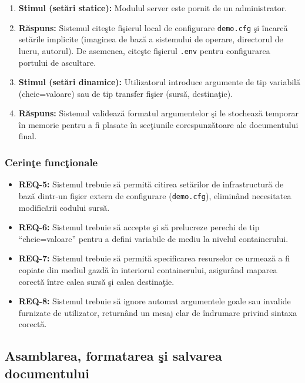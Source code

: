 \documentclass[12pt, a4paper]{article}
\begin{document}
\begin{enumerate}
    \item \textbf{Stimul (set\u{a}ri statice):} Modulul server este pornit de un administrator.
    \item \textbf{R\u{a}spuns:} Sistemul cite\c{s}te fi\c{s}ierul local de configurare \texttt{demo.cfg} \c{s}i \^{i}ncarc\u{a} set\u{a}rile
    implicite (imaginea de baz\u{a} a sistemului de operare, directorul de lucru, autorul). De asemenea,
    cite\c{s}te fi\c{s}ierul \texttt{.env} pentru configurarea portului de ascultare.
    \item \textbf{Stimul (set\u{a}ri dinamice):} Utilizatorul introduce argumente de tip variabil\u{a}
    (cheie=valoare) sau de tip transfer fi\c{s}ier (surs\u{a}, destina\c{t}ie).
    \item \textbf{R\u{a}spuns:} Sistemul valideaz\u{a} formatul argumentelor \c{s}i le stocheaz\u{a} temporar \^{i}n memorie
    pentru a fi plasate \^{i}n sec\c{t}iunile corespunz\u{a}toare ale documentului final.
\end{enumerate}

\subsubsection{Cerin\c{t}e func\c{t}ionale}

\begin{itemize}
    \item \textbf{REQ-5:} Sistemul trebuie s\u{a} permit\u{a} citirea set\u{a}rilor de infrastructur\u{a} de baz\u{a}
    dintr-un fi\c{s}ier extern de configurare (\texttt{demo.cfg}), elimin\^{a}nd necesitatea modific\u{a}rii codului
    surs\u{a}.
    \item \textbf{REQ-6:} Sistemul trebuie s\u{a} accepte \c{s}i s\u{a} prelucreze perechi de tip ``cheie=valoare''
    pentru a defini variabile de mediu la nivelul containerului.
    \item \textbf{REQ-7:} Sistemul trebuie s\u{a} permit\u{a} specificarea resurselor ce urmeaz\u{a} a fi copiate
    din mediul gazd\u{a} \^{i}n interiorul containerului, asigur\^{a}nd maparea corect\u{a} \^{i}ntre calea surs\u{a} \c{s}i
    calea destina\c{t}ie.
    \item \textbf{REQ-8:} Sistemul trebuie s\u{a} ignore automat argumentele goale sau invalide furnizate
    de utilizator, returnând un mesaj clar de \^{i}ndrumare privind sintaxa corect\u{a}.
\end{itemize}

\subsection{Asamblarea, formatarea \c{s}i salvarea documentului}
\end{document}
